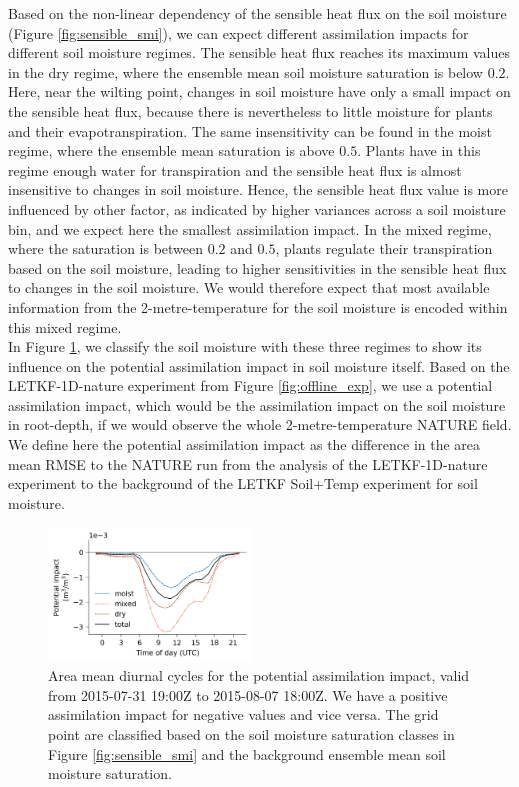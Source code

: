 \documentclass[hess, manuscript]{copernicus}
\begin{document}
Based on the non-linear dependency of the sensible heat flux on the soil moisture (Figure \ref{fig:sensible_smi}), we can expect different assimilation impacts for different soil moisture regimes.
The sensible heat flux reaches its maximum values in the dry regime, where the ensemble mean soil moisture saturation is below $0.2$.
Here, near the wilting point, changes in soil moisture have only a small impact on the sensible heat flux, because there is nevertheless to little moisture for plants and their evapotranspiration.
The same insensitivity can be found in the moist regime, where the ensemble mean saturation is above $0.5$.
Plants have in this regime enough water for transpiration and the sensible heat flux is almost insensitive to changes in soil moisture.
Hence, the sensible heat flux value is more influenced by other factor, as indicated by higher variances across a soil moisture bin, and we expect here the smallest assimilation impact.
In the mixed regime, where the saturation is between $0.2$ and $0.5$, plants regulate  their transpiration based on the soil moisture, leading to higher sensitivities in the sensible heat flux to changes in the soil moisture.
We would therefore expect that most available information from the 2-metre-temperature for the soil moisture is encoded within this mixed regime.\\

In Figure \ref{fig:h_impact}, we classify the soil moisture with these three regimes to show its influence on the potential assimilation impact in soil moisture itself.
Based on the LETKF-1D-nature experiment from Figure \ref{fig:offline_exp}, we use a potential assimilation impact, which would be the assimilation impact on the soil moisture in root-depth, if we would observe the whole 2-metre-temperature NATURE field.
We define here the potential assimilation impact as the difference in the area mean RMSE  to the NATURE run from the analysis of the LETKF-1D-nature experiment to the background of the LETKF Soil+Temp experiment for soil moisture.

\begin{figure}[ht]
	\includegraphics[width=0.48\textwidth]{figures/fig_09_soil_moisture_impact.png}
	\caption{
		Area mean diurnal cycles for the potential assimilation impact, valid from 2015-07-31 19:00Z to 2015-08-07 18:00Z.
		We have a positive assimilation impact for negative values and vice versa.
		The grid point are classified based on the soil moisture saturation classes in Figure \ref{fig:sensible_smi} and the background ensemble mean soil moisture saturation.
	}
	\label{fig:h_impact}
\end{figure}
\end{document}
